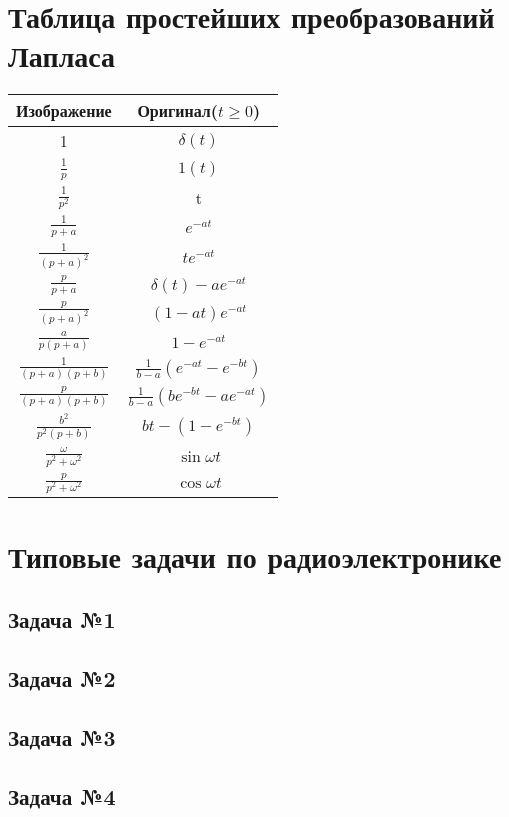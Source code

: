 \documentclass[a4paper,14pt]{extarticle}
\theoremstyle{definition}
\begin{document}


% 


\section{Таблица простейших преобразований Лапласа}
\begin{center}
\begin{tabular}{| c | c |}
	\hline
	Изображение                   & Оригинал($t\geq0$)              \\ \hline
	1			                  & $\delta(t)$                     \\ \hline
	$\frac1p$	                  & $1(t)$                          \\ \hline
	$\frac{1}{p^2}$               & t                               \\ \hline
	$\frac{1}{p+a}$               & $e^{-at}$                       \\ \hline
	$\frac{1}{(p+a)^2}$           & $te^{-at}$                      \\ \hline
	$\frac{p}{p+a}$               & $\delta(t)-ae^{-at}$            \\ \hline
	$\frac{p}{(p+a)^2}$           & $(1-at) e^{-at}$                \\ \hline
	$\frac{a}{p(p+a)}$            & $1-e^{-at}$                     \\ \hline
	$\frac{1}{(p+a)(p+b)}$ & $\frac{1}{b-a} (e^{-at} -e^{-bt} ) $   \\ \hline
	$\frac{p}{(p+a)(p+b)}$ & $\frac{1}{b-a} (be^{-bt} -ae^{-at} ) $ \\ \hline
	$\frac{b^2}{p^2(p+b)}$        & $bt-(1-e^{-bt})$                \\ \hline
	$\frac{\omega}{p^2+\omega^2}$ & $\sin{\omega t}$                \\ \hline
	$\frac{p}{p^2+\omega^2}$      & $\cos{\omega t}$ 	            \\ \hline
\end{tabular}
\end{center}
\section{Типовые задачи по радиоэлектронике}

\subsection{Задача №1}



\subsection{Задача №2}



\subsection{Задача №3}


\subsection{Задача №4}

\end{document}
